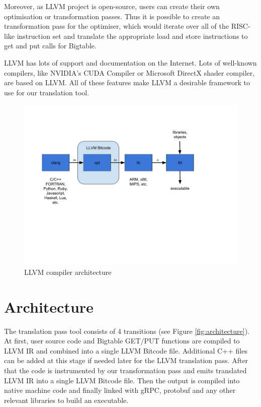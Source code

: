 \documentclass[bsc,frontabs,twoside,singlespacing,parskip,deptreport]{infthesis}     %
\begin{document}
Moreover, as LLVM project is open-source, users can create their own optimisation or transformation passes. Thus it is possible to create an transformation pass for the optimiser, which would iterate over all of the RISC-like instruction set and translate the appropriate load and store instructions to get and put calls for Bigtable.

LLVM has lots of support and documentation on the Internet. Lots of well-known compilers, like NVIDIA's CUDA Compiler or Microsoft DirectX shader compiler, are based on LLVM. All of these features make LLVM a desirable framework to use for our translation tool.

\begin{figure}[H]
\centering
\includegraphics[width=1\textwidth]{images/llvm}
\caption{LLVM compiler architecture}
\label{fig:llvm}
\end{figure}

\section{Architecture}


The translation pass tool consists of 4 transitions (see Figure \ref{fig:architecture}). At first, user source code and Bigtable GET/PUT functions are compiled to LLVM IR and combined into a single LLVM Bitcode file. Additional C++ files can be added at this stage if needed later for the LLVM translation pass. After that the code is instrumented by our transformation pass and emits translated LLVM IR into a single LLVM Bitcode file. Then the output is compiled into native machine code and finally linked with gRPC, protobuf and any other relevant libraries to build an executable.
\end{document}
